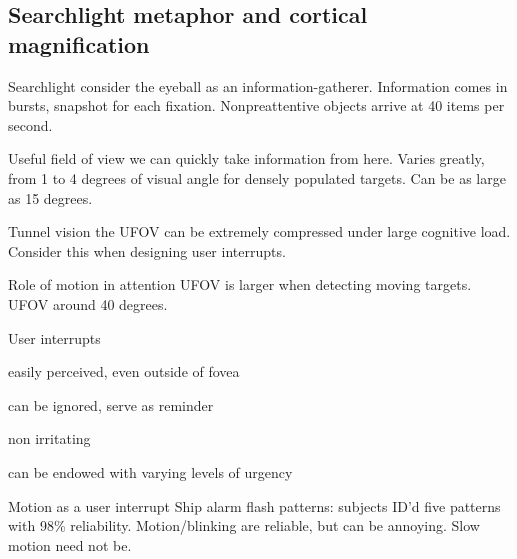 \begin{mdframed}\begin{multicols}{2}
\subsection{Searchlight metaphor and cortical magnification}
\begin{compactdesc}
    \item[Searchlight] consider the eyeball as an information-gatherer.
        Information comes in bursts, snapshot for each fixation. Nonpreattentive
        objects arrive at 40 items per second.
    \item[Useful field of view] we can quickly take information from here.
        Varies greatly, from 1 to 4 degrees of visual angle for densely
        populated targets. Can be as large as 15 degrees.
    \item[Tunnel vision] the UFOV can be extremely compressed under large
        cognitive load. Consider this when designing user interrupts.
    \item[Role of motion in attention] UFOV is larger when detecting moving
        targets. UFOV around 40 degrees.
    \item[User interrupts]
        \begin{compactenum}
        \item easily perceived, even outside of fovea
        \item can be ignored, serve as reminder
        \item non irritating
        \item can be endowed with varying levels of urgency
        \end{compactenum}
    \item[Motion as a user interrupt]
        Ship alarm flash patterns: subjects ID'd five patterns with 98\%
        reliability. Motion/blinking are reliable, but can be annoying.
        Slow motion need not be.
\end{compactdesc}
\end{multicols}
\end{mdframed}





